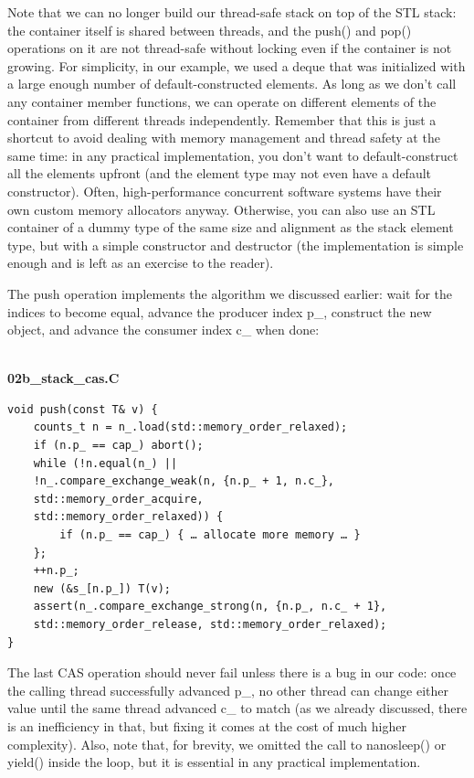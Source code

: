 Note that we can no longer build our thread-safe stack on top of the STL stack: the container itself is shared between threads, and the push() and pop() operations on it are not thread-safe without locking even if the container is not growing. For simplicity, in our example, we used a deque that was initialized with a large enough number of default-constructed elements. As long as we don't call any container member functions, we can operate on different elements of the container from different threads independently. Remember that this is just a shortcut to avoid dealing with memory management and thread safety at the same time: in any practical implementation, you don't want to default-construct all the elements upfront (and the element type may not even have a default constructor). Often, high-performance concurrent software systems have their own custom memory allocators anyway. Otherwise, you can also use an STL container of a dummy type of the same size and alignment as the stack element type, but with a simple constructor and destructor (the implementation is simple enough and is left as an exercise to the reader).

The push operation implements the algorithm we discussed earlier: wait for the indices to become equal, advance the producer index p\_, construct the new object, and advance the consumer index c\_ when done:

\hspace*{\fill} \\ %
\noindent
\textbf{02b\_stack\_cas.C}
\begin{lstlisting}[style=styleCXX]
void push(const T& v) {
	counts_t n = n_.load(std::memory_order_relaxed);
	if (n.p_ == cap_) abort();
	while (!n.equal(n_) ||
	!n_.compare_exchange_weak(n, {n.p_ + 1, n.c_},
	std::memory_order_acquire,
	std::memory_order_relaxed)) {
		if (n.p_ == cap_) { … allocate more memory … }
	};
	++n.p_;
	new (&s_[n.p_]) T(v);
	assert(n_.compare_exchange_strong(n, {n.p_, n.c_ + 1},
	std::memory_order_release, std::memory_order_relaxed);
}
\end{lstlisting}

The last CAS operation should never fail unless there is a bug in our code: once the calling thread successfully advanced p\_, no other thread can change either value until the same thread advanced c\_ to match (as we already discussed, there is an inefficiency in that, but fixing it comes at the cost of much higher complexity). Also, note that, for brevity, we omitted the call to nanosleep() or yield() inside the loop, but it is essential in any practical implementation.

